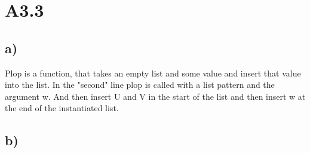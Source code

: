 \section{A3.3}
\subsection{a)}
Plop is a function, that takes an empty list and some value and insert that value into the list.
In the "second" line plop is called with a list pattern and the argument w. And then insert U and V in the start of the list and then
insert w at the end of the instantiated list.

\subsection{b)}
